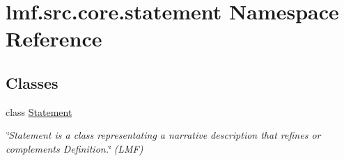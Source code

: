\hypertarget{namespacelmf_1_1src_1_1core_1_1statement}{\section{lmf.\+src.\+core.\+statement Namespace Reference}
\label{namespacelmf_1_1src_1_1core_1_1statement}
}
\subsection*{Classes}
\begin{DoxyCompactItemize}
\item 
class \hyperlink{classlmf_1_1src_1_1core_1_1statement_1_1_statement}{Statement}
\begin{DoxyCompactList}\small\item\em \char`\"{}\+Statement is a class representating a narrative description that refines or complements Definition.\char`\"{} (L\+M\+F) \end{DoxyCompactList}\end{DoxyCompactItemize}
